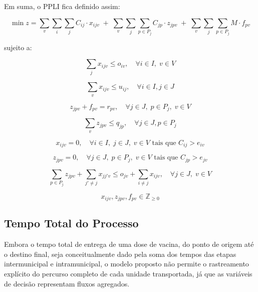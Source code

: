 Em suma, o PPLI fica definido assim:

\begin{equation}
\min z = 
\sum_{v} \sum_{i} \sum_{j} C_{ij} \cdot x_{ijv}
\;+\;
\sum_{v} \sum_{j} \sum_{p \in P_j} C_{jp} \cdot z_{jpv}
\;+\;
\sum_{v} \sum_{j} \sum_{p \in P_j} M \cdot f_{pv}
\label{definicao_ppli_mod1}
\end{equation}

sujeito a:

\begin{equation*}
\sum_{j} x_{ijv} \le o_{iv}, \quad \forall i \in I, \; v \in V
\end{equation*}

\begin{equation*}
\sum_{v} x_{ijv} \le u_{ij}, \quad \forall i \in I, j \in J
\end{equation*}

\begin{equation*}
z_{jpv} + f_{pv} = r_{pv}, \quad \forall j \in J,\; p \in P_j,\; v \in V
\end{equation*}

\begin{equation*}
\sum_{v} z_{jpv} \le q_{jp}, \quad \forall j \in J, p \in P_j
\end{equation*}

\begin{equation*}
x_{ijv} = 0, \quad \forall i \in I, \; j \in J, \; v \in V \text{ tais que } C_{ij} > e_{iv}
\end{equation*}

\begin{equation*}
z_{jpv} = 0, \quad \forall j \in J, \; p \in P_j, \; v \in V \text{ tais que } C_{jp} > e_{jv}
\end{equation*}

\begin{equation*}
\sum_{p \in P_j} z_{jpv} + \sum_{j' \neq j} x_{jj'v} \le o_{jv} + \sum_{i \neq j} x_{ijv}, \quad \forall j \in J, \; v \in V
\end{equation*}

\begin{equation*}
x_{ijv}, z_{jpv}, f_{pv}\in \mathbb{Z}_{\geq 0}
\end{equation*}


\subsection{Tempo Total do Processo}


Embora o tempo total de entrega de uma dose de vacina, do ponto de origem até o destino final, seja conceitualmente dado pela soma dos tempos das etapas intermunicipal e intramunicipal, o modelo proposto não permite o rastreamento explícito do percurso completo de cada unidade transportada, já que as variáveis de decisão representam fluxos agregados.

